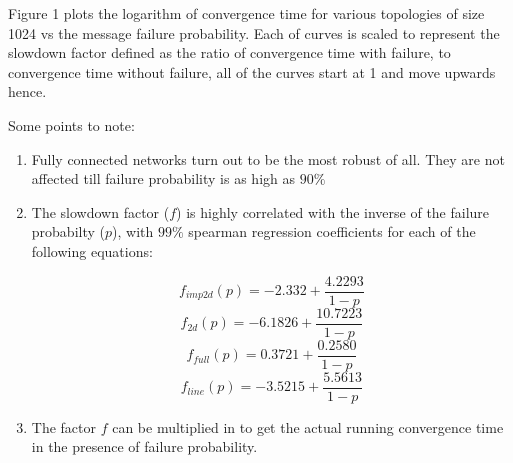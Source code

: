 \documentclass[a4paper, 10pt]{article}
\begin{document}
  Figure 1 plots the logarithm of convergence time for various topologies of size 1024 vs the message failure probability. Each of curves is scaled to represent the slowdown factor defined as the ratio of convergence time with failure, to convergence time without failure, all of the curves start at 1 and move upwards hence.

    Some points to note:

    \begin{enumerate}
      \item{Fully connected networks turn out to be the most robust of all. They are not affected till failure probability is as high as $90\%$}
      \item{The slowdown factor ($f$) is highly correlated with the inverse of the failure probabilty ($p$), with $99\%$ spearman regression coefficients for each of the following equations:}

      \begin{equation}
        f_{imp2d}(p) = -2.332 + \frac{4.2293}{1-p}
      \end{equation}
      \begin{equation}
        f_{2d}(p) = -6.1826 + \frac{10.7223}{1-p}
      \end{equation}
      \begin{equation}
        f_{full}(p) = 0.3721 + \frac{0.2580}{1-p}
      \end{equation}
      \begin{equation}
        f_{line}(p) = -3.5215 + \frac{5.5613}{1-p}
      \end{equation}

      \item{The factor $f$ can be multiplied in to get the actual running convergence time in the presence of failure probability.}
    \end{enumerate}
\end{document}
